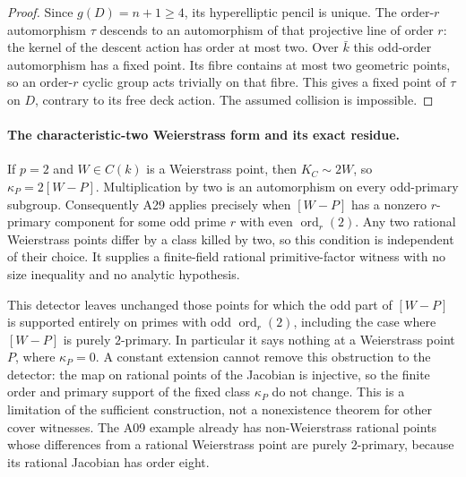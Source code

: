 \documentclass[11pt,a4paper]{article}
\begin{document}
\begin{proof}
Since $g(D)=n+1\ge4$, its hyperelliptic pencil is unique.
The order-$r$ automorphism $\tau$ descends to an automorphism
of that projective line of order $r$: the kernel of the descent
action has order at most two. Over $\bar k$ this odd-order
automorphism has a fixed point. Its fibre contains at most two
geometric points, so an order-$r$ cyclic group acts trivially on
that fibre. This gives a fixed point of $\tau$ on $D$, contrary
to its free deck action. The assumed collision is impossible.
\end{proof}

\paragraph{The characteristic-two Weierstrass form and its exact residue.}
If $p=2$ and $W\in C(k)$ is a Weierstrass point, then
$K_C\sim2W$, so $\kappa_P=2[W-P]$. Multiplication by two is
an automorphism on every odd-primary subgroup. Consequently A29
applies precisely when $[W-P]$ has a nonzero $r$-primary component
for some odd prime $r$ with even $\operatorname{ord}_r(2)$.
Any two rational Weierstrass points differ by a class killed by
two, so this condition is independent of their choice.
It supplies a finite-field rational primitive-factor witness with
no size inequality and no analytic hypothesis.

This detector leaves unchanged those points for which the odd part
of $[W-P]$ is supported entirely on primes with odd
$\operatorname{ord}_r(2)$, including the case where $[W-P]$ is
purely $2$-primary. In particular it says nothing at a Weierstrass
point $P$, where $\kappa_P=0$. A constant extension cannot remove
this obstruction to the detector: the map on rational points of
the Jacobian is injective, so the finite order and primary support
of the fixed class $\kappa_P$ do not change. This is a limitation
of the sufficient construction, not a nonexistence theorem for
other cover witnesses. The A09 example already has non-Weierstrass
rational points whose differences from a rational Weierstrass
point are purely $2$-primary, because its rational Jacobian has
order eight.
\end{document}
